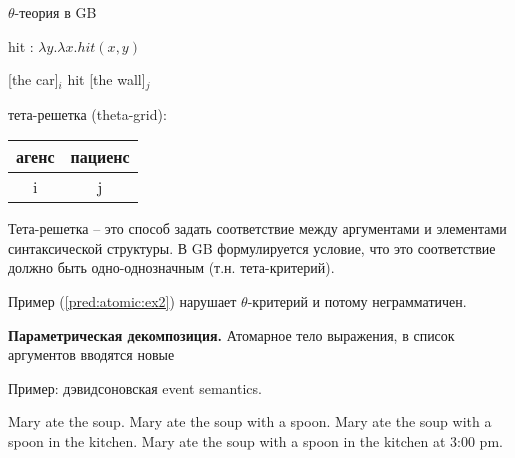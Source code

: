 \documentclass[10pt]{article}
\theoremstyle{example-style}
\begin{document}
$\theta$-теория в GB

hit : $\lambda y . \lambda x . hit(x,y)$

[the car]$_i$ hit [the wall]$_j$

тета-решетка (theta-grid):

\begin{table}[ht]
\centering
\begin{tabular}{|c|c|}
\hline
агенс & пациенс \\ \hline
i     & j       \\ \hline
\end{tabular}
\end{table}

Тета-решетка -- это способ задать соответствие между аргументами и элементами синтаксической структуры. В GB формулируется условие, что это соответствие должно быть одно-однозначным (т.н. тета-критерий). 

\begin{exe}
   \label{pred:atomic:ex2}
\end{exe}

Пример (\ref{pred:atomic:ex2}) нарушает $\theta$-критерий и потому неграмматичен.

\textbf{Параметрическая декомпозиция.} Атомарное тело выражения, в список аргументов вводятся новые

\begin{exe}
\end{exe}

Пример: дэвидсоновская event semantics.

\begin{exe}
\ex 
  \begin{xlist}
    \ex Mary ate the soup.
    \ex Mary ate the soup with a spoon.
    \ex Mary ate the soup with a spoon in the kitchen.
    \ex Mary ate the soup with a spoon in the kitchen at 3:00 pm.
  \end{xlist}
\ex 
  \begin{xlist}
  \end{xlist}
\end{exe}
\end{document}
